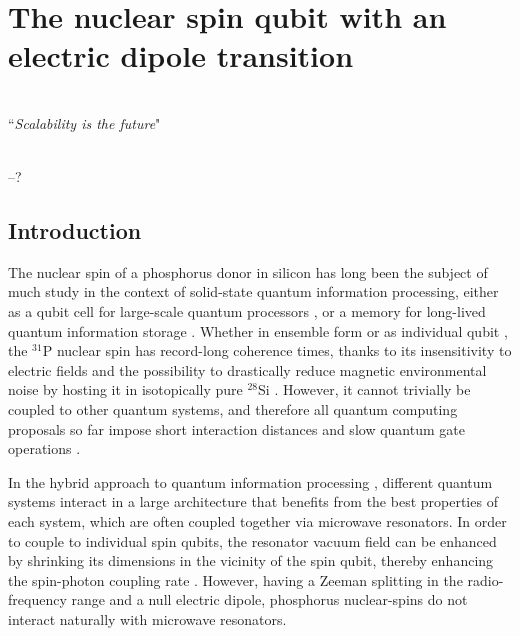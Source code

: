
\chapter{The nuclear spin qubit with an electric dipole transition} %

\label{Chapter3} %

\HRule
\vspace{0.5cm} \hspace{2cm}
\small
\hangindent=4cm
\\
        ``\emph{Scalability is the future}"
\\ \\
\hangindent=4cm
\begin{flushright}
--? \\
\end{flushright}

\vspace{0.5cm}

\noindent \HRule
\clearpage


\section{Introduction}

The nuclear spin of a phosphorus donor in silicon has long been the subject of much study in the context of solid-state quantum information processing, either as a qubit cell for large-scale quantum processors \cite{Kane1998,Ogorman2016,Hill2015}, or a memory for long-lived quantum information storage \cite{Morton2008,Freer2017}. Whether in ensemble form \cite{Saeedi2013} or as individual qubit \cite{Muhonen2014}, the $^{31}$P nuclear spin has record-long coherence times, thanks to its insensitivity to electric fields and the possibility to drastically reduce magnetic environmental noise by hosting it in isotopically pure $^{28}$Si \cite{Itoh2014}. However, it cannot trivially be coupled to other quantum systems, and therefore all quantum computing proposals so far impose short interaction distances and slow quantum gate operations \cite{Kane1998,Ogorman2016,Hill2015}.

In the hybrid approach to quantum information processing \cite{Xiang2013}, different quantum systems interact in a large architecture that benefits from the best properties of each system, which are often coupled together via microwave resonators. In order to couple to individual spin qubits, the resonator vacuum field can be enhanced by shrinking its dimensions in the vicinity of the spin qubit, thereby enhancing the spin-photon coupling rate \cite{Tosi2014,Jenkins2016,Haikka2017,Sarabi2017}. However, having a Zeeman splitting in the radio-frequency range and a null electric dipole, phosphorus nuclear-spins do not interact naturally with microwave resonators.

